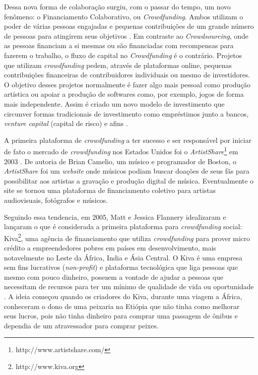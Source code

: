 Dessa nova forma de colaboração surgiu, com o passar do tempo, um novo fenômeno: o Financiamento Colaborativo, ou \emph{Crowdfunding}. Ambos utilizam o poder de várias pessoas engajadas e pequenas contribuições de um grande número de pessoas para atingirem seus objetivos \cite{crowdfunding-culture}. Em contraste ao \emph{Crowdsourcing}, onde as pessoas financiam a si mesmas ou são financiadas com recompensas para fazerem o trabalho, o fluxo de capital no \emph{Crowdfunding} é o contrário. Projetos que utilizam \emph{crowdfunding} pedem, através de plataformas online, pequenas contribuições financeiras de contribuidores individuais ou mesmo de investidores. O objetivo desses projetos normalmente é fazer algo mais pessoal como produção artística ou apoiar a produção de softwares como, por exemplo, jogos de forma mais independente. Assim é criado um novo modelo de investimento que circunver formas tradicionais de investimento como empréstimos junto a bancos, \emph{venture capital} (capital de risco) e afins \cite{belleflamme2010}.

A primeira plataforma de \emph{crowdfunding} a ter sucesso e ser responsável por iniciar de fato o mercado de \emph{crowdfunding} nos Estados Unidos foi o \emph{ArtistShare}\footnote{http://www.artistshare.com/} em 2003 \cite{freedman2015brief}. De autoria de Brian Camelio, um músico e programador de Boston, o \emph{ArtistShare} foi um \emph{website} onde músicos podiam buscar doações de seus fãs para possibilitar aos artistas a gravação e produção digital de música. Eventualmente o site se tornou uma plataforma de financiamento coletivo para artistas audiovisuais, fotógrafos e músicos.

Seguindo essa tendencia, em 2005, Matt e Jessica Flannery idealizaram e lançaram o que é considerada a primeira plataforma para \emph{crowdfunding} social: Kiva\footnote{http://www.kiva.org}, uma agência de financiamento que utiliza \emph{crowdfunding} para prover micro crédito a empreendedores pobres em países em desenvolvimento, mais notavelmente no Leste da África, India e Ásia Central. O Kiva é uma empresa sem fins lucrativos (\emph{non-profit}) e plataforma tecnológica que liga pessoas que mesmo com pouco dinheiro, possuem a vontade de ajudar a pessoas que necessitam de recursos para ter um mínimo de qualidade de vida ou oportunidade \cite{flannery2007kiva}. A ideia começou quando os criadores do Kiva, durante uma viagem a África, conheceram o dono de uma peixaria na Etiópia que não tinha como melhorar seus lucros, pois não tinha dinheiro para comprar uma passagem de ônibus e dependia de um atravessador para comprar peixes.

